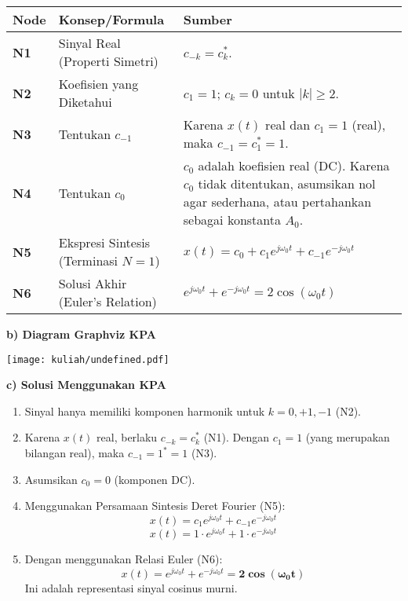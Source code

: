 \documentclass[
  letterpaper,
  DIV=11,
  numbers=noendperiod]{scrreprt}
\providecommand{\tightlist}{%
  \setlength{\itemsep}{0pt}\setlength{\parskip}{0pt}}
\begin{document}
\begin{longtable}[]{@{}
  >{\centering\arraybackslash}p{}
  >{\raggedright\arraybackslash}p{}
  >{\raggedright\arraybackslash}p{}@{}}
\toprule\noalign{}
\begin{minipage}[b]{\linewidth}\centering
Node
\end{minipage} & \begin{minipage}[b]{\linewidth}\raggedright
Konsep/Formula
\end{minipage} & \begin{minipage}[b]{\linewidth}\raggedright
Sumber
\end{minipage} \\
\midrule\noalign{}
\endhead
\bottomrule\noalign{}
\endlastfoot
\textbf{N1} & Sinyal Real (Properti Simetri) & \(c_{-k} = c^*_k\). \\
\textbf{N2} & Koefisien yang Diketahui & \(c_1 = 1\); \(c_k=0\) untuk
\(|k| \ge 2\). \\
\textbf{N3} & Tentukan \(c_{-1}\) & Karena \(x(t)\) real dan \(c_1=1\)
(real), maka \(c_{-1} = c^*_1 = 1\). \\
\textbf{N4} & Tentukan \(c_0\) & \(c_0\) adalah koefisien real (DC).
Karena \(c_0\) tidak ditentukan, asumsikan nol agar sederhana, atau
pertahankan sebagai konstanta \(A_0\). \\
\textbf{N5} & Ekspresi Sintesis (Terminasi \(N=1\)) &
\(x(t) = c_0 + c_1 e^{j\omega_0 t} + c_{-1} e^{-j\omega_0 t}\) \\
\textbf{N6} & Solusi Akhir (Euler's Relation) &
\(e^{j\omega_0 t} + e^{-j\omega_0 t} = 2 \cos(\omega_0 t)\) \\
\end{longtable}

\textbf{b) Diagram Graphviz KPA}

\texttt{[image: kuliah/undefined.pdf]}

\textbf{c) Solusi Menggunakan KPA}

\begin{enumerate}
\def\labelenumi{\arabic{enumi}.}
\tightlist
\item
  Sinyal hanya memiliki komponen harmonik untuk \(k=0, +1, -1\) (N2).
\item
  Karena \(x(t)\) real, berlaku \(c_{-k} = c^*_k\) (N1). Dengan
  \(c_1 = 1\) (yang merupakan bilangan real), maka \(c_{-1} = 1^* = 1\)
  (N3).
\item
  Asumsikan \(c_0 = 0\) (komponen DC).
\item
  Menggunakan Persamaan Sintesis Deret Fourier (N5):
  \[x(t) = c_1 e^{j\omega_0 t} + c_{-1} e^{-j\omega_0 t}\]
  \[x(t) = 1 \cdot e^{j\omega_0 t} + 1 \cdot e^{-j\omega_0 t}\]
\item
  Dengan menggunakan Relasi Euler (N6):
  \[x(t) = e^{j\omega_0 t} + e^{-j\omega_0 t} = \mathbf{2 \cos(\omega_0 t)}\]
  Ini adalah representasi sinyal cosinus murni.
\end{enumerate}
\end{document}
